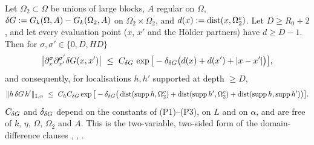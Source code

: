 \begin{lemma}\label{lem:a07:K3}
Let $\Omega_2\subset\Omega$ be unions of large blocks, $A$ regular on $\Omega$, $\delta G:= G_k(\Omega,A)-G_k(\Omega_2,A)$ on $\Omega_2\times\Omega_2$, and $d(x):=\operatorname{dist}(x,\Omega_2^c)$. Let $D\ge R_0+2$, and let every evaluation point ($x$, $x'$ and the H\"older partners) have $d\ge D-1$. Then for $\sigma,\sigma'\in\{0,D,HD\}$
\[
\big|\partial^\sigma_x\partial^{\sigma'}_{x'}\dG(x,x')\big|\ \le\ C_{\dG}\,\exp\big[-\delta_{\dG}\big(d(x)+d(x')+|x-x'|\big)\big],
\]
and consequently, for localisations $h,h'$ supported at depth $\ge D$,
\[
\norm{h\,\dG\,h'}_{1,\alpha}\ \le\ C_hC_{\dG}\exp\big[-\delta_{\dG}\big(\dist(\supp h,\Omega_2^c)+\dist(\supp h',\Omega_2^c)+\dist(\supp h,\supp h')\big)\big].
\]
$C_{\delta G}$ and $\delta_{\delta G}$ depend on the constants of \textup{(P1)--(P3)}, on $L$ and on $\alpha$, and are free of $k$, $\eta$, $\Omega$, $\Omega_2$ and $A$. This is the two-variable, two-sided form of the domain-difference clauses \cite[(2.26)]{Ba1}, \cite[(1.20)]{Ba4}, \cite[(2.5)]{Ba3}.
\end{lemma}


